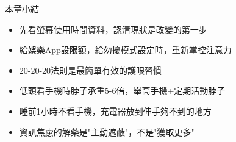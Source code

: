 \begin{tcbsummary}{本章小結}
\begin{itemize}
  \item 先看螢幕使用時間資料，認清現狀是改變的第一步
  \item 給娛樂App設限額，給勿擾模式設定時，重新掌控注意力
  \item 20-20-20法則是最簡單有效的護眼習慣
  \item 低頭看手機時脖子承重5-6倍，舉高手機+定期活動脖子
  \item 睡前1小時不看手機，充電器放到伸手夠不到的地方
  \item 資訊焦慮的解藥是"主動遮蔽"，不是"獲取更多"
\end{itemize}

\end{tcbsummary}
